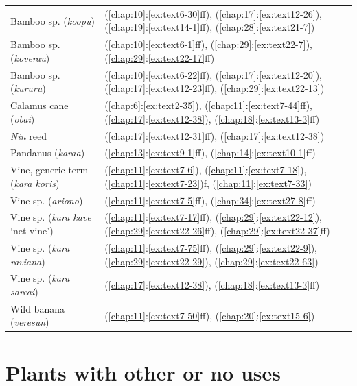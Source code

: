 \begin{tabularx}{\textwidth}{p{}X}
    Bamboo sp. (\textit{koopu})&(\ref{chap:10}:\ref{ex:text6-30}ff), (\ref{chap:17}:\ref{ex:text12-26}), (\ref{chap:19}:\ref{ex:text14-1}ff), (\ref{chap:28}:\ref{ex:text21-7})\\
    Bamboo sp. (\textit{koverau})&(\ref{chap:10}:\ref{ex:text6-1}ff), (\ref{chap:29}:\ref{ex:text22-7}), (\ref{chap:29}:\ref{ex:text22-17}ff)\\
    Bamboo sp. (\textit{kururu})&(\ref{chap:10}:\ref{ex:text6-22}ff), (\ref{chap:17}:\ref{ex:text12-20}), (\ref{chap:17}:\ref{ex:text12-23}ff), (\ref{chap:29}:\ref{ex:text22-13})\\
    Calamus cane (\textit{obai})&(\ref{chap:6}:\ref{ex:text2-35}), (\ref{chap:11}:\ref{ex:text7-44}ff), (\ref{chap:17}:\ref{ex:text12-38}), (\ref{chap:18}:\ref{ex:text13-3}ff)\\
    \textit{Nin} reed&(\ref{chap:17}:\ref{ex:text12-31}ff), (\ref{chap:17}:\ref{ex:text12-38})\\
    Pandanus (\textit{karaa})&(\ref{chap:13}:\ref{ex:text9-1}ff), (\ref{chap:14}:\ref{ex:text10-1}ff)\\
    Vine, generic term (\textit{kara koris})&(\ref{chap:11}:\ref{ex:text7-6}), (\ref{chap:11}:\ref{ex:text7-18}), (\ref{chap:11}:\ref{ex:text7-23})f, (\ref{chap:11}:\ref{ex:text7-33})\\
    Vine sp. (\textit{ariono})&(\ref{chap:11}:\ref{ex:text7-5}ff), (\ref{chap:34}:\ref{ex:text27-8}ff)\\
    Vine sp. (\textit{kara kave} `net vine')&(\ref{chap:11}:\ref{ex:text7-17}ff), (\ref{chap:29}:\ref{ex:text22-12}), (\ref{chap:29}:\ref{ex:text22-26}ff), (\ref{chap:29}:\ref{ex:text22-37}ff)\\
    Vine sp. (\textit{kara raviana})&(\ref{chap:11}:\ref{ex:text7-75}ff), (\ref{chap:29}:\ref{ex:text22-9}), (\ref{chap:29}:\ref{ex:text22-29}), (\ref{chap:29}:\ref{ex:text22-63})\\
    Vine sp. (\textit{kara sareai})&(\ref{chap:17}:\ref{ex:text12-38}), (\ref{chap:18}:\ref{ex:text13-3}ff)\\
    Wild banana (\textit{veresun})&(\ref{chap:11}:\ref{ex:text7-50}ff), (\ref{chap:20}:\ref{ex:text15-6})\\
\end{tabularx}

\section{Plants with other or no uses}\label{ind:nouse}

